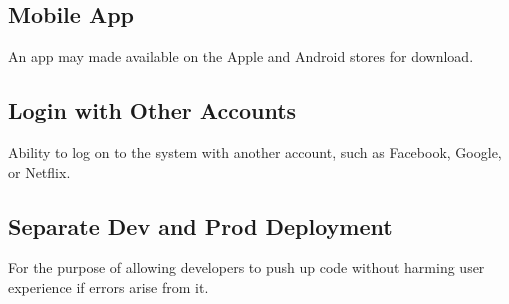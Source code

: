 \documentclass{article}
\begin{document}
\subsection{Mobile App}
An app may made available on the Apple and Android stores for download.

\subsection{Login with Other Accounts}
Ability to log on to the system with another account, such as Facebook, Google, or Netflix.

\subsection{Separate Dev and Prod Deployment}
For the purpose of allowing developers to push up code without harming user experience if errors arise from it.
\end{document}
